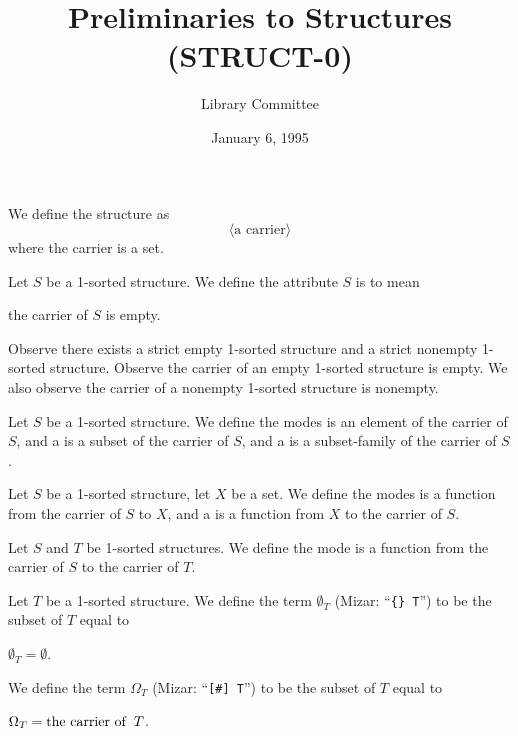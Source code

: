 \documentclass{article}
\title{Preliminaries to Structures (STRUCT-0)}
\author{Library Committee}
\date{January 6, 1995}
\begin{document}
\maketitle

\begin{definition}
  We define the  structure as
  \[\langle\mbox{a carrier}\rangle\]
  where the carrier is a set.
\end{definition}

\begin{definition}
Let $S$ be a 1-sorted structure.
We define the attribute $S$ is  to mean
\begin{defn}
\item the carrier of $S$ is empty.
\end{defn}
\end{definition}

Observe there exists a strict empty 1-sorted structure and a strict
nonempty 1-sorted structure. Observe the carrier of an empty 1-sorted
structure is empty. We also observe the carrier of a nonempty 1-sorted
structure is nonempty.

\begin{definition}
  Let $S$ be a 1-sorted structure.
  We define the modes  is an element of the
  carrier of $S$, and a  is a subset of the
  carrier of $S$, and a  is a subset-family
  of the carrier of $S$.
\end{definition}

\begin{definition}
Let $S$ be a 1-sorted structure, let $X$ be a set.
We define the modes  is a function from the
carrier of $S$ to $X$, and a 
is a function from $X$ to the carrier of $S$.
\end{definition}

\begin{definition}
Let $S$ and $T$ be 1-sorted structures.
We define the mode  is a function from the
carrier of $S$ to the carrier of $T$.
\end{definition}

\begin{definition}
Let $T$ be a 1-sorted structure.
We define the term $\emptyset_{T}$ (Mizar: ``\verb#{} T#'') to be the subset of $T$ equal to
\begin{defn}
\item $\emptyset_{T}=\emptyset$.
\end{defn}
We define the term $\Omega_{T}$ (Mizar: ``\verb|[#] T|'') to be the
subset of $T$ equal to
\begin{defn}
\item $\Omega_{T}=\operatorname{the\ carrier\ of\ }T$.
\end{defn}
\end{definition}
\end{document}
